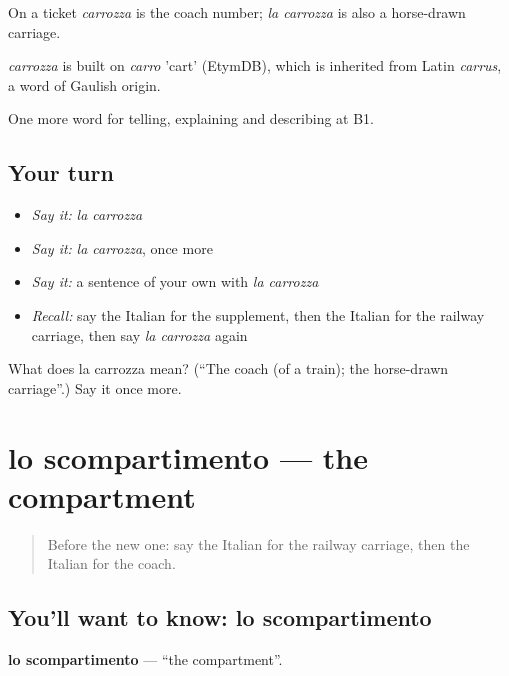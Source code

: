 On a ticket \emph{carrozza} is the coach number; \emph{la carrozza} is also a horse-drawn carriage.

\begin{cousinweb}
\emph{carrozza} is built on \emph{carro} 'cart' (EtymDB), which is inherited from Latin \emph{carrus}, a word of Gaulish origin.
\end{cousinweb}

\begin{grammarlens}[title={What you've built}]
One more word for telling, explaining and describing at B1.
\end{grammarlens}

\subsection*{Your turn}
\begin{itemize}
\raggedright
  \item \emph{Say it:} \emph{la carrozza}
  \item \emph{Say it:} \emph{la carrozza}, once more
  \item \emph{Say it:} a sentence of your own with \emph{la carrozza}
  \item \emph{Recall:} say the Italian for the supplement, then the Italian for the railway carriage, then say \emph{la carrozza} again
\end{itemize}

\begin{tcolorbox}[breakable,colback=teal!4,colframe=teal!35!black,title={Before you move on}]
What does la carrozza mean? (\textquotedblleft{}The coach (of a train); the horse-drawn carriage\textquotedblright{}.) Say it once more.
\end{tcolorbox}
\section[lo scompartimento]{lo scompartimento — the compartment}

\label{lesson:IT-C419-scompartimento}



\begin{quote}
Before the new one: say the Italian for the railway carriage, then the Italian for the coach.
\end{quote}

\subsection*{You'll want to know: lo scompartimento}
\textbf{lo scompartimento} — \textquotedblleft{}the compartment\textquotedblright{}.

